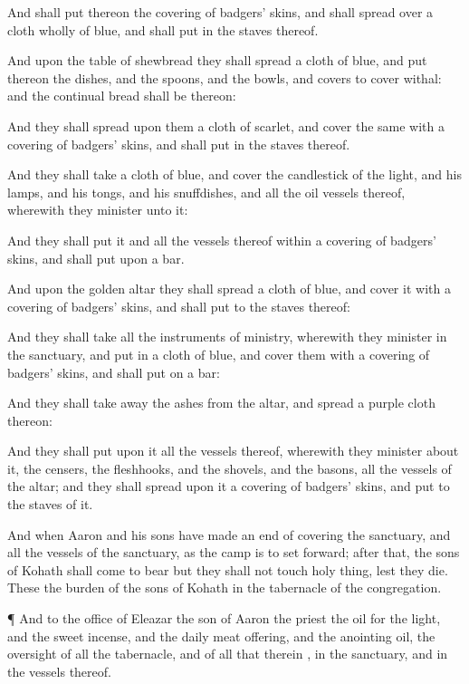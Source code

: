 {And shall
put thereon the
covering of
badgers’
skins, and shall
spread
over
{} a
cloth
wholly of
blue, and shall
put in the
staves thereof.

And upon the
table of
shewbread they shall
spread a
cloth of
blue, and
put thereon the
dishes, and the
spoons, and the
bowls, and
covers to cover
withal: and the
continual
bread shall be thereon:

And they shall
spread upon them a
cloth of
scarlet, and
cover the same with a
covering of
badgers’
skins, and shall
put in the
staves thereof.

And they shall
take a
cloth of
blue, and
cover the
candlestick of the
light, and his
lamps, and his
tongs, and his
snuffdishes, and all the
oil
vessels thereof, wherewith they
minister unto it:

And they shall
put it and all the
vessels thereof within a
covering of
badgers’
skins, and shall
put
{} upon a
bar.

And upon the
golden
altar they shall
spread a
cloth of
blue, and
cover it with a
covering of
badgers’
skins, and shall
put to the
staves thereof:

And they shall
take all the
instruments of
ministry, wherewith they
minister in the
sanctuary, and
put
{} in a
cloth of
blue, and
cover them with a
covering of
badgers’
skins, and shall
put
{} on a
bar:

And they shall take away the
ashes from the
altar, and
spread a
purple
cloth thereon:

And they shall
put upon it all the
vessels thereof, wherewith they
minister about it,
{} the
censers, the
fleshhooks, and the
shovels, and the
basons, all the
vessels of the
altar; and they shall
spread upon it a
covering of
badgers’
skins, and
put to the
staves of it.

And when
Aaron and his
sons have made an
end of
covering the
sanctuary, and all the
vessels of the
sanctuary, as the
camp is to set
forward;
after that, the
sons of
Kohath shall
come to
bear
{} but they shall not
touch
{} holy
thing, lest they
die. These
{} the
burden of the
sons of
Kohath in the
tabernacle of the
congregation.


\par }{\PP {}¶ And to the
office of
Eleazar the
son of
Aaron the
priest
{} the
oil for the
light, and the
sweet
incense, and the
daily meat
offering, and the
anointing
oil,
{} the
oversight of all the
tabernacle, and of all that therein
{}, in the
sanctuary, and in the
vessels thereof.


}
